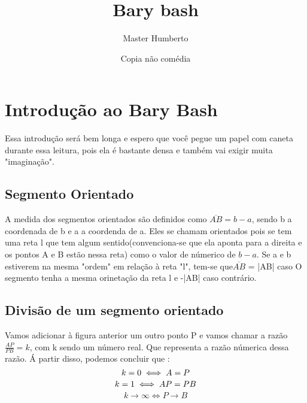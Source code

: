 \documentclass{article}
\title{Bary bash}
\author{Master Humberto}
\date{Copia não comédia}
\begin{document}
\maketitle
\tableofcontents

\section{Introdução ao Bary Bash}

Essa introdução será bem longa e espero que você pegue um papel com caneta durante essa leitura, pois ela é bastante densa e também vai exigir muita "imaginação".
\subsection{Segmento Orientado}
A medida dos segmentos orientados são definidos como $\overline{AB} = b - a$, sendo b a coordenada de b e a a coordenda de a. Eles se chamam orientados pois se tem uma reta l que tem algum sentido(convenciona-se que ela aponta para a direita e os pontos A e B estão nessa reta) como o valor de númerico de $b-a.$ Se a e b estiverem na mesma "ordem" em relação à reta "l", tem-se que$ \overline{AB}$ = |AB| caso O segmento tenha a mesma orinetação da reta l e -|AB| caso contrário.
\\



\begin{center}
\end{center}

\subsection{Divisão de um segmento orientado}

Vamos adicionar à figura anterior um outro ponto P e vamos chamar a razão $\frac{AP}{PB} = k$, com k sendo um número real. Que representa a razão númerica dessa razão. Á partir disso, podemos concluir que :
$$
k = 0 \iff A = P \\
$$
$$
k = 1 \iff AP = PB \\
$$
$$
k \to \infty \iff P \to B
$$
\end{document}
